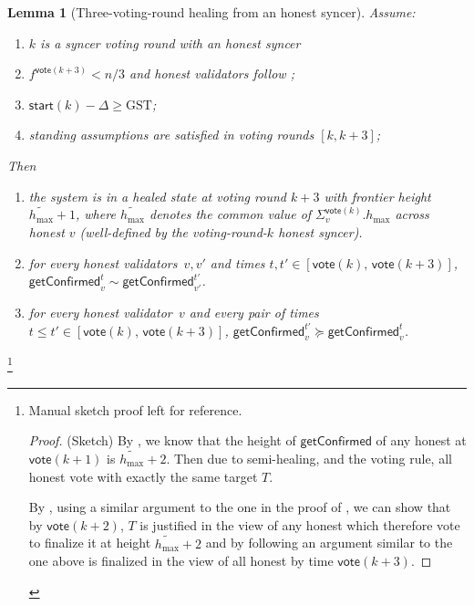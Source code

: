 \ifx\litemode\undefined\documentclass{article}\fi
\newcommand{\hmax}{\ensuremath{h_{\max}}\xspace}
\newcommand{\start}{\ensuremath{\mathsf{start}}}
\newcommand{\vote}{\ensuremath{\mathsf{vote}}}
\newcommand{\GST}{\ensuremath{\mathrm{GST}}\xspace}
\newcommand{\comm}[1]{\ensuremath{\widetilde{#1}}}
\newcommand{\getConfirmed}{\textsf{getConfirmed}\xspace}
\theoremstyle{plain}
\newtheorem{lemma}{Lemma}
\theoremstyle{definition}
\theoremstyle{remark}
\begin{document}
\begin{lemma}[Three-voting-round healing from an honest syncer]\label{lem:healing-3slot}
Assume:
\begin{enumerate}
  \item $k$ is a syncer voting round with an honest syncer
  \item $f^{\vote(k+3)} < n/3$ and honest validators follow ;
  \item $\start(k) - \Delta \geq \GST$;
  \item standing assumptions are satisfied in voting rounds $[k,k+3]$;
\end{enumerate}
Then
\begin{enumerate}
  \item the system is in a healed state at voting round $k+3$ with frontier height $\comm{\hmax}+1$, where $\comm{\hmax}$ denotes the common value of $\Sigma_v^{\vote(k)}.\hmax$ across honest $v$ (well-defined by the voting-round-$k$ honest syncer).
  \item for every honest validators~$v, v'$ and times $t, t' \in [\vote(k),\, \vote(k+3)]$, $\getConfirmed_v^{t} \sim \getConfirmed_{v'}^{t'}$.
  \item for every honest validator~$v$ and every pair of times $t \leq t' \in [\vote(k),\, \vote(k+3)]$, $\getConfirmed_v^{t'} \succeq \getConfirmed_v^{t}$.
\end{enumerate}
\end{lemma}

\iffull
\footnote{
Manual sketch proof left for reference.
\begin{proof}(Sketch)
  By , we know that the height of $\getConfirmed$ of any honest at $\vote(k+1)$ is $\comm{\hmax}+2$.
  Then due to semi-healing, and the voting rule, all honest vote with exactly the same target $T$.

  By , using a similar argument to the one in the proof of , we can show that by $\vote(k+2)$, $T$ is justified in the view of any honest which therefore vote to finalize it at height $\comm{\hmax}+2$ and by following an argument similar to the one above is finalized in the view of all honest by time $\vote(k+3)$.
\end{proof}}
\fi
\end{document}

